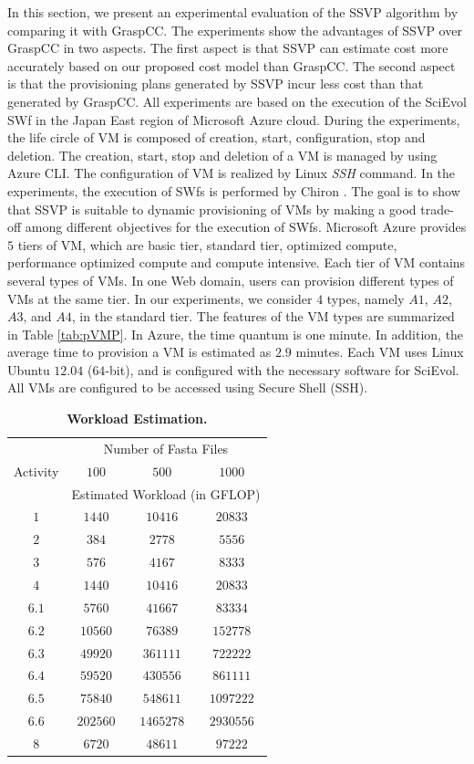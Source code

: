 In this section, we present an experimental evaluation of the SSVP algorithm by comparing it with GraspCC. 
The experiments show the advantages of SSVP over GraspCC in two aspects. The first aspect is that SSVP can estimate cost more accurately based on our proposed cost model than GraspCC. The second aspect is that the provisioning plans generated by SSVP incur less cost than that generated by GraspCC. 
All experiments are based on the execution of the SciEvol SWf in the Japan East region of Microsoft Azure cloud.
During the experiments, the life circle of VM is composed of creation, start, configuration, stop and deletion. The creation, start, stop and deletion of a VM is managed by using Azure CLI. The configuration of VM is realized by Linux \textit{SSH} command.
In the experiments, the execution of SWfs is performed by Chiron \cite{Ogasawara2013}. 
The goal is to show that SSVP is suitable to dynamic provisioning of VMs by making a good trade-off among different objectives for the execution of SWfs. Microsoft Azure provides $5$ tiers of VM, which are basic tier, standard tier, optimized compute, performance optimized compute and compute intensive. Each tier of VM contains several types of VMs. In one Web domain, users can provision different types of VMs at the same tier. In our experiments, we consider $4$ types, namely $A1$, $A2$, $A3$, and $A4$, in the standard tier. The features of the VM types are summarized in Table \ref{tab:pVMP}. In Azure, the time quantum is one minute. In addition, the average time to provision a VM is estimated as $2.9$ minutes. Each VM uses Linux Ubuntu $12.04$ ($64$-bit), and is configured with the necessary software for SciEvol. All VMs are configured to be accessed using Secure Shell (SSH).

\begin{table}[htbp]
\caption{\textbf{Workload Estimation. }} 
\label{app:pWE}
\begin{centering}
\captionsetup{justification=centering}
\begin{tabular}{|c|c|c|c|}
\hline 
\multirow{ 3}{*}{Activity} & \multicolumn{3}{|c|}{Number of Fasta Files} \\
\cline{2-4}
& $100$ & $500$ & $1000$ \\
\cline{2-4}
& \multicolumn{3}{|c|}{Estimated Workload (in GFLOP)} \tabularnewline
\hline
$1$ & $1440$ & $10416$ & $20833$ \tabularnewline
$2$ & $384$ & $2778$ & $5556$ \tabularnewline
$3$ & $576$ & $4167$ & $8333$ \tabularnewline
$4$ & $1440$ & $10416$ & $20833$ \tabularnewline
$6.1$ & $5760$ & $41667$ & $83334$ \tabularnewline
$6.2$ & $10560$ & $76389$ & $152778$ \tabularnewline
$6.3$ & $49920$ & $361111$ & $722222$ \tabularnewline
$6.4$ & $59520$ & $430556$ & $861111$ \tabularnewline
$6.5$ & $75840$ & $548611$ & $1097222$ \tabularnewline
$6.6$ & $202560$ & $1465278$ & $2930556$ \tabularnewline
$8$ & $6720$ & $48611$ & $97222$ \tabularnewline
\hline 
\end{tabular}
\par\end{centering} 
\end{table}

